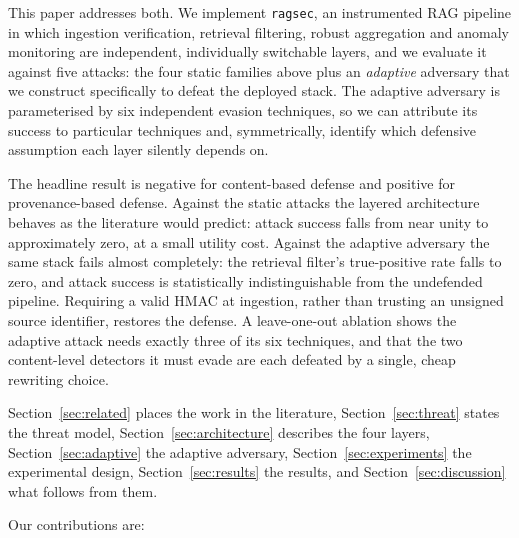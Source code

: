 This paper addresses both. We implement \texttt{ragsec}, an instrumented RAG pipeline in which
ingestion verification, retrieval filtering, robust aggregation and anomaly monitoring are
independent, individually switchable layers, and we evaluate it against five attacks: the four
static families above plus an \emph{adaptive} adversary that we construct specifically to
defeat the deployed stack. The adaptive adversary is parameterised by six independent evasion
techniques, so we can attribute its success to particular techniques and, symmetrically,
identify which defensive assumption each layer silently depends on.

The headline result is negative for content-based defense and positive for provenance-based
defense. Against the static attacks the layered architecture behaves as the literature would
predict: attack success falls from near unity to approximately zero, at a small utility cost.
Against the adaptive adversary the same stack fails almost completely: the retrieval
filter's true-positive rate falls to zero, and attack success is statistically
indistinguishable from the undefended pipeline. Requiring a valid HMAC at ingestion, rather
than trusting an unsigned source identifier, restores the defense. A leave-one-out ablation shows the
adaptive attack needs exactly three of its six techniques, and that the two content-level
detectors it must evade are each defeated by a single, cheap rewriting choice.

Section~\ref{sec:related} places the work in the literature, Section~\ref{sec:threat} states
the threat model, Section~\ref{sec:architecture} describes the four layers,
Section~\ref{sec:adaptive} the adaptive adversary, Section~\ref{sec:experiments} the
experimental design, Section~\ref{sec:results} the results, and Section~\ref{sec:discussion}
what follows from them.

Our contributions are:

